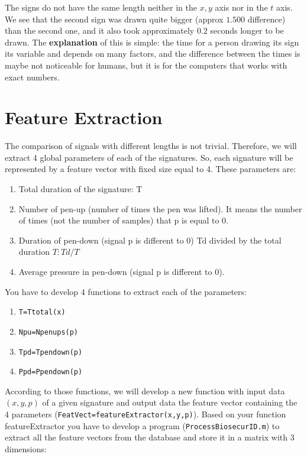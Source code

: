 \documentclass[a4paper]{article}
\def\inline{\lstinline[basicstyle=\ttfamily,keywordstyle={}]}
\begin{document}
{The signs do not have the same length neither in the $x,y$ axis nor in the $t$ axis. We see that the second sign was drawn quite bigger (approx $1.500$ difference) than the second one, and it also took approximately $0.2$ seconds longer to be drawn. The \textbf{explanation} of this is simple: the time for a person drawing its sign its variable and depends on many factors, and the difference between the times is maybe not noticeable for humans, but it is for the computers that works with exact numbers.

\section{Feature Extraction}


The comparison of signals with different lengths is not trivial. Therefore, we will extract 4 global parameters of each of the signatures. So, each signature will be represented by a feature vector with fixed size equal to 4. These parameters are:

\begin{enumerate}
\item	Total duration of the signature: T
\item	Number of pen-up (number of times the pen was lifted). It means the number of times (not the number of samples) that p is equal to 0.
\item	Duration of pen-down (signal p is different to 0) Td divided by the total duration \(T:Td/T\)
\item	Average pressure in pen-down (signal p is different to 0).
\end{enumerate}
You have to develop 4 functions to extract each of the parameters: 
\begin{enumerate}
  \item	\inline{T=Ttotal(x)}
  \item	\inline{Npu=Npenups(p)} 
  \item \inline{Tpd=Tpendown(p)}
  \item	\inline{Ppd=Ppendown(p)}
\end{enumerate}

According to those functions, we will develop a new function with input data \((x,y,p)\) of a given signature and output data the feature vector containing the 4 parameters (\inline{FeatVect=featureExtractor(x,y,p)}).
Based on your function featureExtractor you have to develop a program (\inline{ProcessBiosecurID.m}) to extract all the feature vectors from the database and store it in a matrix with 3 dimensions:

}
\end{document}
